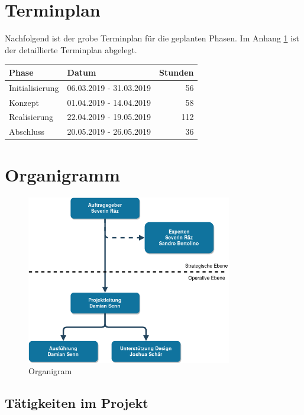 \section{Terminplan}\label{terminplan}

Nachfolgend ist der grobe Terminplan für die geplanten Phasen. Im Anhang \ref{terminplan} ist
der detaillierte Terminplan abgelegt.

\begin{longtable}[]{@{}llr@{}}
  \toprule
  Phase           & Datum                   & Stunden\tabularnewline
  \midrule
  \endhead
  Initialisierung & 06.03.2019 - 31.03.2019 & 56\tabularnewline
  Konzept         & 01.04.2019 - 14.04.2019 & 58\tabularnewline
  Realisierung    & 22.04.2019 - 19.05.2019 & 112\tabularnewline
  Abschluss       & 20.05.2019 - 26.05.2019 & 36\tabularnewline
  \bottomrule
\end{longtable}

\clearpage

\section{Organigramm}\label{organigramm}

\begin{figure}[!htb]
  \centering
  \includegraphics[width=0.8\textwidth]{figures/organigram.png}
  \caption{Organigram}
\end{figure}

\subsection{Tätigkeiten im Projekt}\label{tuxe4tigkeiten-im-projekt}

